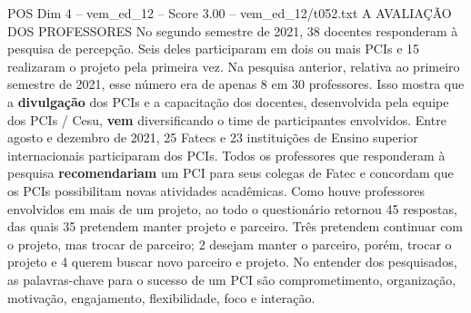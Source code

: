 \begin{textsample}{POS Dim 4 – vem\_ed\_12 – Score 3.00 – vem\_ed\_12/t052.txt}  \label{ex:f4_pos_140}
A AVALIAÇÃO DOS PROFESSORES No segundo semestre de 2021, 38 docentes responderam à pesquisa de percepção.
Seis deles participaram em dois ou mais PCIs e 15 realizaram o projeto pela primeira vez.
Na pesquisa anterior, relativa ao primeiro semestre de 2021, esse número era de apenas 8 em 30 professores.
Isso mostra que a \textbf{divulgação} dos PCIs e a capacitação dos docentes, desenvolvida pela equipe dos PCIs / Cesu, \textbf{vem} diversificando o time de participantes envolvidos.
Entre agosto e dezembro de 2021, 25 Fatecs e 23 instituições de Ensino superior internacionais participaram dos PCIs.
Todos os professores que responderam à pesquisa \textbf{recomendariam} um PCI para seus colegas de Fatec e concordam que os PCIs possibilitam novas atividades acadêmicas.
Como houve professores envolvidos em mais de um projeto, ao todo o questionário retornou 45 respostas, das quais 35 pretendem manter projeto e parceiro.
Três pretendem continuar com o projeto, mas trocar de parceiro; 2 desejam manter o parceiro, porém, trocar o projeto e 4 querem buscar novo parceiro e projeto.
No entender dos pesquisados, as palavras-chave para o sucesso de um PCI são comprometimento, organização, motivação, engajamento, flexibilidade, foco e interação.

\end{textsample}
